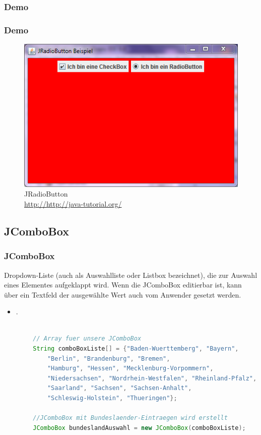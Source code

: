 \documentclass[xcolor=dvipsnames]{beamer}
\begin{document}
\subsubsection{Demo}
\begin{frame}
  \frametitle{Demo}
	\begin{figure}
		\includegraphics[scale=0.8]{images/jradiobutton.PNG}
		\caption{JRadioButton \\ \tiny{\textcolor{gray}{\url{http://http://java-tutorial.org/}}}}
		\end{figure}
\end{frame}


\subsection{JComboBox}
\begin{frame}  %
  \frametitle{JComboBox} %
  \begin{block}{Dropdown-Liste (auch als Auswahlliste oder Listbox bezeichnet), die zur Auswahl eines Elementes aufgeklappt wird. Wenn die JComboBox editierbar ist, kann über ein Textfeld der ausgewählte Wert auch vom Anwender gesetzt werden.}
	  \begin{itemize}
		\item .
	  \end{itemize}
  \end{block}

\begin{lstlisting}[language=java,basicstyle=\scriptsize\ttfamily]

    	// Array fuer unsere JComboBox
        String comboBoxListe[] = {"Baden-Wuerttemberg", "Bayern",
            "Berlin", "Brandenburg", "Bremen",
            "Hamburg", "Hessen", "Mecklenburg-Vorpommern",
            "Niedersachsen", "Nordrhein-Westfalen", "Rheinland-Pfalz",
            "Saarland", "Sachsen", "Sachsen-Anhalt",
            "Schleswig-Holstein", "Thueringen"};
 
        //JComboBox mit Bundeslaender-Eintraegen wird erstellt
        JComboBox bundeslandAuswahl = new JComboBox(comboBoxListe);

\end{lstlisting}

\end{frame}
\end{document}
